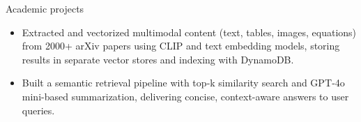 \documentclass{resume}
\begin{document}
\begin{experienceSection}{Academic projects}
    \projectItem[
        title=RAG Implementation for arXiv Papers,
        duration={Oct 2024 - Nov 2024},
    ]
    \begin{itemize}
        \vspace{-0.5em}
        \itemsep -6pt {}
        \item Extracted and vectorized multimodal content (text, tables, images, equations) from 2000+ arXiv papers using CLIP and text embedding models, storing results in separate vector stores and indexing with DynamoDB.
        \item Built a semantic retrieval pipeline with top‑k similarity search and GPT‑4o mini-based summarization, delivering concise, context-aware answers to user queries.
    \end{itemize}
    
\end{experienceSection}
\end{document}
